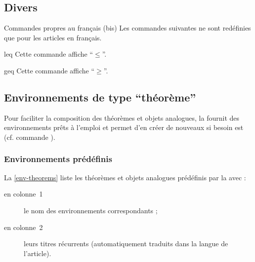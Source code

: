 \documentclass[french,nolocaltoc]{nwejmart}
\newtheorem[style=definition]{fait}
\newtheorem[title=expérience]{experience}
\newtheorem[title-plural=anneaux]{anneau}
\newtheorem[title=idéal,title-plural=idéaux]{ideal}
\begin{document}
\subsection{Divers}

\begin{dbremark}{Commandes propres au français (bis)}{}
  Les commandes suivantes ne sont redéfinies que pour les articles en
  français.
\end{dbremark}

\begin{docCommand}{leq}{}
  Cette commande affiche \enquote{$\leq$}.
\end{docCommand}
\begin{docCommand}{geq}{}
  Cette commande affiche \enquote{$\geq$}.
\end{docCommand}

\subsection{Environnements de type \enquote{théorème}}

Pour faciliter la composition des théorèmes et objets analogues, la
\nwejmauthorcl{} fournit des environnements prêts à l'emploi et permet d'en
créer de nouveaux si besoin est (cf. commande ).

\subsubsection{Environnements prédéfinis}
\label{sec:envir-de-type}

La \vref{env-theorems} liste les théorèmes et objets analogues prédéfinis par la
\nwejmauthorcl{} avec :
\begin{description}
\item[en colonne~1] le nom des environnements correspondants ;
\item[en colonne~2] leurs titres récurrents (automatiquement traduits dans la
  langue de l'article).
\end{description}
\end{document}
